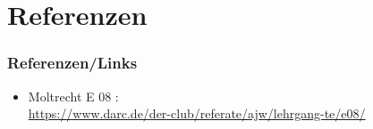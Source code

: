 %

\section*{Referenzen}
\begin{frame}
  \frametitle{Referenzen/Links}

  \footnotesize
  \begin{itemize}
    \item Moltrecht E 08 : \\
      \url{https://www.darc.de/der-club/referate/ajw/lehrgang-te/e08/}
  \end{itemize}

\end{frame}


